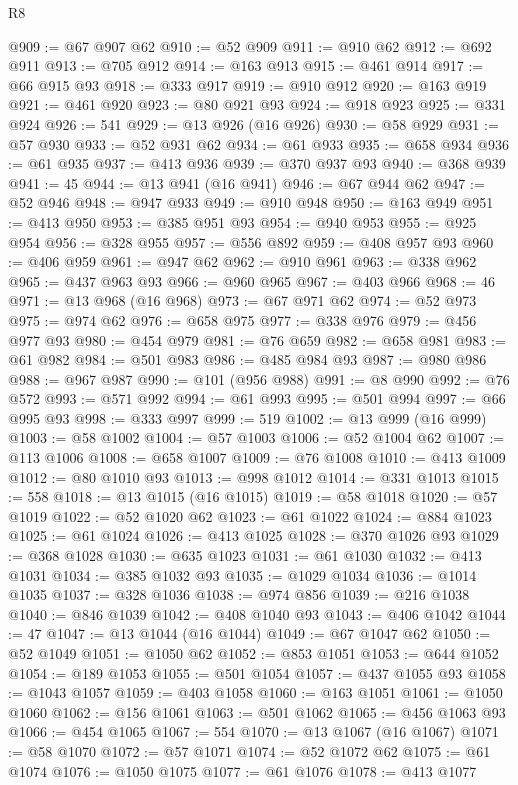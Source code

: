 \begin{lexlean}{R8}
\begin{coremodule}
@909 := @67 @907 @62
@910 := @52 @909
@911 := @910 @62
@912 := @692 @911
@913 := @705 @912
@914 := @163 @913
@915 := @461 @914
@917 := @66 @915 @93
@918 := @333 @917
@919 := @910 @912
@920 := @163 @919
@921 := @461 @920
@923 := @80 @921 @93
@924 := @918 @923
@925 := @331 @924
@926 := 541
@929 := @13 @926 (@16 @926)
@930 := @58 @929
@931 := @57 @930
@933 := @52 @931 @62
@934 := @61 @933
@935 := @658 @934
@936 := @61 @935
@937 := @413 @936
@939 := @370 @937 @93
@940 := @368 @939
@941 := 45
@944 := @13 @941 (@16 @941)
@946 := @67 @944 @62
@947 := @52 @946
@948 := @947 @933
@949 := @910 @948
@950 := @163 @949
@951 := @413 @950
@953 := @385 @951 @93
@954 := @940 @953
@955 := @925 @954
@956 := @328 @955
@957 := @556 @892
@959 := @408 @957 @93
@960 := @406 @959
@961 := @947 @62
@962 := @910 @961
@963 := @338 @962
@965 := @437 @963 @93
@966 := @960 @965
@967 := @403 @966
@968 := 46
@971 := @13 @968 (@16 @968)
@973 := @67 @971 @62
@974 := @52 @973
@975 := @974 @62
@976 := @658 @975
@977 := @338 @976
@979 := @456 @977 @93
@980 := @454 @979
@981 := @76 @659
@982 := @658 @981
@983 := @61 @982
@984 := @501 @983
@986 := @485 @984 @93
@987 := @980 @986
@988 := @967 @987
@990 := @101 (@956 @988)
@991 := @8 @990
@992 := @76 @572
@993 := @571 @992
@994 := @61 @993
@995 := @501 @994
@997 := @66 @995 @93
@998 := @333 @997
@999 := 519
@1002 := @13 @999 (@16 @999)
@1003 := @58 @1002
@1004 := @57 @1003
@1006 := @52 @1004 @62
@1007 := @113 @1006
@1008 := @658 @1007
@1009 := @76 @1008
@1010 := @413 @1009
@1012 := @80 @1010 @93
@1013 := @998 @1012
@1014 := @331 @1013
@1015 := 558
@1018 := @13 @1015 (@16 @1015)
@1019 := @58 @1018
@1020 := @57 @1019
@1022 := @52 @1020 @62
@1023 := @61 @1022
@1024 := @884 @1023
@1025 := @61 @1024
@1026 := @413 @1025
@1028 := @370 @1026 @93
@1029 := @368 @1028
@1030 := @635 @1023
@1031 := @61 @1030
@1032 := @413 @1031
@1034 := @385 @1032 @93
@1035 := @1029 @1034
@1036 := @1014 @1035
@1037 := @328 @1036
@1038 := @974 @856
@1039 := @216 @1038
@1040 := @846 @1039
@1042 := @408 @1040 @93
@1043 := @406 @1042
@1044 := 47
@1047 := @13 @1044 (@16 @1044)
@1049 := @67 @1047 @62
@1050 := @52 @1049
@1051 := @1050 @62
@1052 := @853 @1051
@1053 := @644 @1052
@1054 := @189 @1053
@1055 := @501 @1054
@1057 := @437 @1055 @93
@1058 := @1043 @1057
@1059 := @403 @1058
@1060 := @163 @1051
@1061 := @1050 @1060
@1062 := @156 @1061
@1063 := @501 @1062
@1065 := @456 @1063 @93
@1066 := @454 @1065
@1067 := 554
@1070 := @13 @1067 (@16 @1067)
@1071 := @58 @1070
@1072 := @57 @1071
@1074 := @52 @1072 @62
@1075 := @61 @1074
@1076 := @1050 @1075
@1077 := @61 @1076
@1078 := @413 @1077

\end{coremodule}
\end{lexlean}

